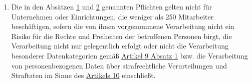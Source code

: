 \begin{enumerate}
  \item Die in den Absätzen \hyperref[itm:30-1]{1} und \hyperref[itm:30-2]{2} genannten Pflichten gelten nicht für
   Unternehmen oder Einrichtungen, die weniger als 250 Mitarbeiter beschäftigen, sofern die von ihnen vorgenommene
   Verarbeitung nicht ein Risiko für die Rechte und Freiheiten der betroffenen Personen birgt, die Verarbeitung nicht
   nur gelegentlich erfolgt oder nicht die Verarbeitung besonderer Datenkategorien gemäß \hyperref[itm:09-1]{Artikel 9
   Absatz 1} bzw. die  Verarbeitung von personenbezogenen Daten über strafrechtliche Verurteilungen und Straftaten im
   Sinne des \hyperref[ch:10]{Artikels 10} einschließt.
  \label{itm:30-5}

\end{enumerate}


